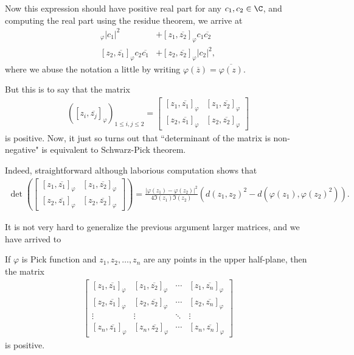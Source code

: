 Now this expression should have positive real part for any $c_{1}, c_{2} \in \C$, and computing the real part using the residue theorem, we arrive at
\begin{align*}
	[z_{1}, \overline{z_{1}}]_{\varphi} |c_{1}|^{2} &+ [z_{1}, \overline{z_{2}}]_{\varphi} c_{1} \overline{c_{2}} \\
	[z_{2}, \overline{z_{1}}]_{\varphi} c_{2} \overline{c_{1}} &+ [z_{2}, \overline{z_{2}}]_{\varphi} |c_{2}|^{2},
\end{align*}
where we abuse the notation a little by writing $\varphi(\overline{z}) = \overline{\varphi(z)}$.

But this is to say that the matrix
\begin{align*}
	\left([z_{i}, \overline{z_{j}}]_{\varphi}\right)_{1 \leq i, j \leq 2} =
	\begin{bmatrix}
		[z_{1}, \overline{z_{1}}]_{\varphi} & [z_{1}, \overline{z_{2}}]_{\varphi} \\
		[z_{2}, \overline{z_{1}}]_{\varphi} & [z_{2}, \overline{z_{2}}]_{\varphi}
	\end{bmatrix}
\end{align*}
is positive. Now, it just so turns out that ``determinant of the matrix is non-negative" is equivalent to Schwarz-Pick theorem.

Indeed, straightforward although laborious computation shows that
\begin{align}\label{pick2_determinant}
	\det\left(
	\begin{bmatrix}
		[z_{1}, \overline{z_{1}}]_{\varphi} & [z_{1}, \overline{z_{2}}]_{\varphi} \\
		[z_{2}, \overline{z_{1}}]_{\varphi} & [z_{2}, \overline{z_{2}}]_{\varphi}
	\end{bmatrix}
	\right)
	=
	\frac{|\varphi(z_{1}) - \varphi(z_{2})|^2}{4 \Im(z_{1}) \Im(z_{2})} \left( d(z_{1}, z_{2})^2 - d(\varphi(z_{1}), \varphi(z_{2})^2)\right).
\end{align}

It is not very hard to generalize the previous argument larger matrices, and we have arrived to
\begin{lause}\label{pick-nevanlinna_theorem}
	If $\varphi$ is Pick function and $z_{1}, z_{2}, \ldots, z_{n}$ are any points in the upper half-plane, then the matrix
	\begin{align}\label{Pick_matrix}
	\begin{bmatrix}
		[z_{1}, \overline{z_{1}}]_{\varphi} & [z_{1}, \overline{z_{2}}]_{\varphi} & \cdots & [z_{1}, \overline{z_{n}}]_{\varphi} \\
		[z_{2}, \overline{z_{1}}]_{\varphi} & [z_{2}, \overline{z_{2}}]_{\varphi} & \cdots & [z_{2}, \overline{z_{n}}]_{\varphi} \\
		\vdots & \vdots & \ddots & \vdots \\
		[z_{n}, \overline{z_{1}}]_{\varphi} & [z_{n}, \overline{z_{2}}]_{\varphi} & \cdots &  [z_{n}, \overline{z_{n}}]_{\varphi}
	\end{bmatrix}
	\end{align}
	is positive.
\end{lause}

